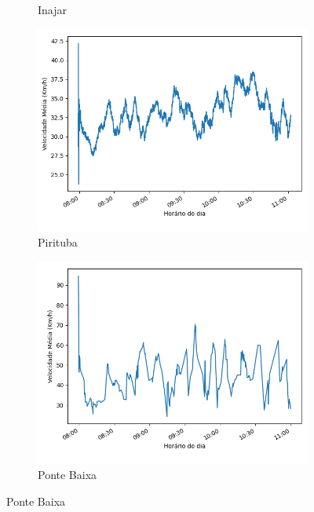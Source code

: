 \begin{figure}[ht]
\begin{subfigure}{.45\textwidth}
  \caption{Inajar}
  \label{fig::avg_speed_Inajar}
\end{subfigure}
\centering
\begin{subfigure}{.45\textwidth}
  \centering
  \includegraphics[width=\textwidth]{figuras/detect_graphics/avg_speed_7-dez-su-corr_Pirituba.png}
  \caption{Pirituba}
  \label{fig::avg_speed_Pirituba}
\end{subfigure}%
\begin{subfigure}{.45\textwidth}
  \centering
  \includegraphics[width=\textwidth]{figuras/detect_graphics/avg_speed_7-dez-su-corr_PonteBaixa.png}
  \caption{Ponte Baixa}

\end{subfigure}
\end{figure}
